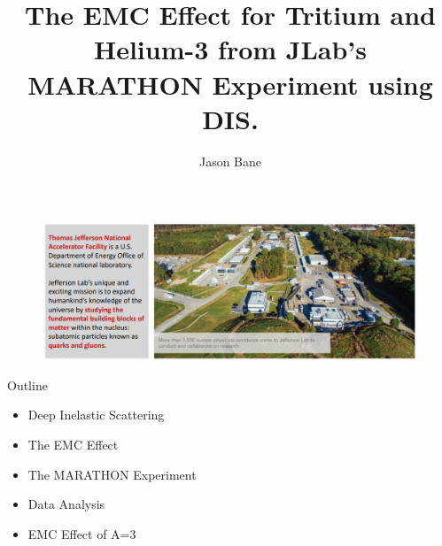 \documentclass[12pt]{beamer}
\title[EMC A=3]{The EMC Effect for Tritium and Helium-3 from JLab's MARATHON Experiment using DIS.} %
\author{Jason Bane} %
\institute[UTK] %
{
University of Tennessee \\ %
\medskip
\textit{jbane1@vols.utk.edu} %
}
\date{} %
\begin{document}
\begin{frame}
	\titlepage %
\end{frame}

\begin{frame}
\begin{figure}
	\includegraphics[width=12cm]{../images/Jlab1.png}
\end{figure}
\end{frame}
\begin{frame}{Outline}
\large{
\begin{itemize}
	\item Deep Inelastic Scattering
	\item The EMC Effect
	\item The MARATHON Experiment
	\item Data Analysis
	\item EMC Effect of A=3
\end{itemize} 
}


\end{frame}
\end{document}
